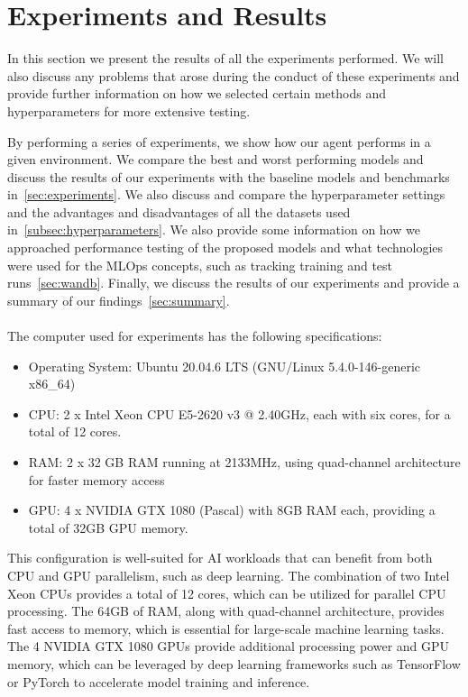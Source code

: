 \documentclass[../xlapes02]{subfiles}
\begin{document}
    \chapter{Experiments and Results}\label{sec:experiments-and-results}
    In this section we present the results of all the experiments performed. We will also discuss any problems that arose during the conduct of these experiments and provide further information on how we selected certain methods and hyperparameters for more extensive testing.

    By performing a series of experiments, we show how our agent performs in a given environment. We compare the best and worst performing models and discuss the results of our experiments with the baseline models and benchmarks in~\cref{sec:experiments}. We also discuss and compare the hyperparameter settings and the advantages and disadvantages of all the datasets used in~\cref{subsec:hyperparameters}. We also provide some information on how we approached performance testing of the proposed models and what technologies were used for the MLOps concepts, such as tracking training and test runs~\cref{sec:wandb}. Finally, we discuss the results of our experiments and provide a summary of our findings~\cref{sec:summary}.
    \\
    \\
    The computer used for experiments has the following specifications:
    \begin{itemize}
        \item Operating System: Ubuntu 20.04.6 LTS (GNU/Linux 5.4.0-146-generic x86\_64)
        \item CPU: 2 x Intel Xeon CPU E5-2620 v3 @ 2.40GHz, each with six cores, for a total of 12 cores.
        \item RAM: 2 x 32 GB RAM running at 2133MHz, using quad-channel architecture for faster memory access
        \item GPU: 4 x NVIDIA GTX 1080 (Pascal) with 8GB RAM each, providing a total of 32GB GPU memory.
    \end{itemize}
    This configuration is well-suited for AI workloads that can benefit from both CPU and GPU parallelism, such as deep learning. The combination of two Intel Xeon CPUs provides a total of 12 cores, which can be utilized for parallel CPU processing. The 64GB of RAM, along with quad-channel architecture, provides fast access to memory, which is essential for large-scale machine learning tasks. The 4 NVIDIA GTX 1080 GPUs provide additional processing power and GPU memory, which can be leveraged by deep learning frameworks such as TensorFlow or PyTorch to accelerate model training and inference.
\end{document}
